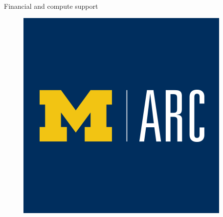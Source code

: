 \documentclass[]{beamer}
\begin{document}
\begin{frame}{Financial and compute support}
\begin{minipage}{0.23\linewidth}
\begin{figure}
			\includegraphics[width=0.99\linewidth,trim={0em 3cm 0em 3cm},clip]{back_matter/arc.png}
		\end{figure}
	\end{minipage}
\end{frame}
\end{document}
